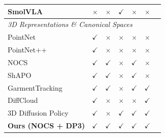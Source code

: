 \begin{table}[ht]
\begin{tabular}{lcccccc}
SmolVLA~\cite{smolvla2025}                      & $\times$ & $\times$ & $\checkmark$ & $\times$     & $\times$ \\
\midrule
\multicolumn{6}{l}{\textit{3D Representations \& Canonical Spaces}} \\
\midrule
PointNet~\cite{qi2017pointnetdeeplearningpoint} & $\checkmark$ & $\times$     & $\times$     & $\times$     & $\times$ \\
PointNet++~\cite{qi2017pointnet2}               & $\checkmark$ & $\times$     & $\times$     & $\times$     & $\times$ \\
NOCS~\cite{wang2019normalized}                  & $\checkmark$ & $\checkmark$ & $\times$     & $\checkmark$ & $\times$ \\
ShAPO~\cite{irshad2022shapoimplicitrepresentationsmultiobject} & $\checkmark$ & $\checkmark$ & $\times$ & $\checkmark$ & $\times$ \\
GarmentTracking~\cite{xue2025garmenttrackingcategorylevelgarmentpose} & $\checkmark$ & $\checkmark$ & $\times$ & $\checkmark$ & $\checkmark$ \\
DiffCloud~\cite{sundaresan2025diffcloudrealtosimpointclouds}   & $\checkmark$ & $\times$     & $\times$     & $\times$     & $\checkmark$ \\
3D Diffusion Policy~\cite{ze2024dp3}            & $\checkmark$ & $\times$     & $\checkmark$ & $\checkmark$ & $\checkmark$ \\
\midrule
\textbf{Ours (NOCS + DP3)}                      & $\checkmark$ & $\checkmark$ & $\checkmark$ & $\checkmark$ & $\checkmark$ \\
\bottomrule
\end{tabular}
\end{table}